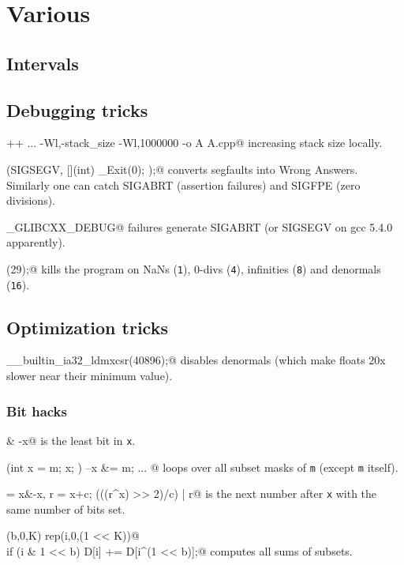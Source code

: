 \chapter{Various}

\section{Intervals}


\section{Debugging tricks}
\verb@g++ ... -Wl,-stack_size -Wl,1000000 -o A A.cpp@ increasing stack size locally.

\verb@signal(SIGSEGV, [](int) { _Exit(0); });@ converts segfaults into Wrong Answers.
			Similarly one can catch SIGABRT (assertion failures) and SIGFPE (zero divisions).

\verb@_GLIBCXX_DEBUG@ failures generate SIGABRT (or SIGSEGV on gcc 5.4.0 apparently).

\verb@feenableexcept(29);@ kills the program on NaNs (\texttt 1), 0-divs (\texttt 4), infinities (\texttt 8) and denormals (\texttt{16}).

\section{Optimization tricks}
	\verb@__builtin_ia32_ldmxcsr(40896);@ disables denormals (which make floats 20x slower near their minimum value).
	\subsection{Bit hacks}
		\verb@x & -x@ is the least bit in \texttt{x}.
		
		\verb@for (int x = m; x; ) { --x &= m; ... }@ loops over all subset masks of \texttt{m} (except \texttt{m} itself).
		
		\verb@c = x&-x, r = x+c; (((r^x) >> 2)/c) | r@ is the next number after \texttt{x} with the same number of bits set.
		
		\verb@rep(b,0,K) rep(i,0,(1 << K))@ \\ \verb@  if (i & 1 << b) D[i] += D[i^(1 << b)];@ computes all sums of subsets.
